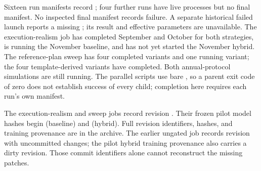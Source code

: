 Sixteen run manifests record ; four further runs have live processes but no final manifest. No inspected final manifest records failure. A separate historical failed launch reports a missing ; its result and effective parameters are unavailable. The execution-realism job has completed September and October for both strategies, is running the November baseline, and has not yet started the November hybrid. The reference-plan sweep has four completed variants and one running variant; the four template-derived variants have completed. Both annual-protocol simulations are still running. The parallel scripts use bare , so a parent exit code of zero does not establish success of every child; completion here requires each run's own manifest.

The execution-realism and sweep jobs record revision . Their frozen pilot model hashes begin  (baseline) and  (hybrid). Full revision identifiers, hashes, and training provenance are in the archive. The earlier ungated job records revision  with uncommitted changes; the pilot hybrid training provenance also carries a dirty revision. Those commit identifiers alone cannot reconstruct the missing patches.


